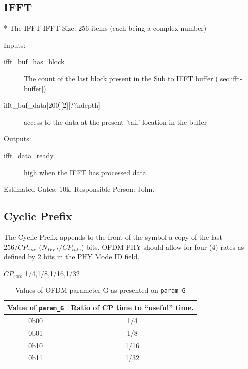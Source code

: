 \documentclass[dvips,10pt,twocolumn]{article}
\begin{document}
	\subsection{IFFT}
	\label{sec:ifft}
	*
	The IFFT 
	IFFT Size: 256 items (each being a complex number)
	\begin{description}
		\item{Inputs:}
		\begin{description}
			\item[ifft\_buf\_has\_block] The count of the last
				block present in the Sub to IFFT buffer
				(\autoref{sec:ifft-buffer})
			
			\item[ifft\_buf\_data{[200][2][??ndepth]}] access
				to the data at the present 'tail' location
				in the buffer
		\end{description}
		
		\item{Outputs:}
		\begin{description}
			\item[ifft\_data\_ready] high when the IFFT has
				processed data.
		\end{description}
	\end{description}

	Estimated Gates: 10k.
	Responsible Person: John.

	\subsection{Cyclic Prefix}
	\label{sec:cyclic_prefix}
	
	The Cyclic Prefix appends to the front of the symbol a copy of the last
 	$256/CP_{rate}$ ($N_{IFFT}/CP_{rate}$) bits. OFDM PHY should allow for four
	(4) rates as defined by 2 bits in the PHY Mode ID field. 

	$CP_{rate}$ 1/4,1/8,1/16,1/32
	
	
	
	\begin{table}
	\begin{tabulary}{0.5\textwidth}{C|C}
		\label{tbl:param-g-vals}
		Value of \texttt{param\_G} & Ratio of CP time to
		``useful'' time. \\ \hline

		0b00 & 1/4 \\
		0b01 & 1/8 \\
		0b10 & 1/16 \\
		0b11 & 1/32 \\

	\end{tabulary}
	\caption{Values of OFDM parameter G as presented on
	\texttt{param\_G}}
	\end{table}
\end{document}

